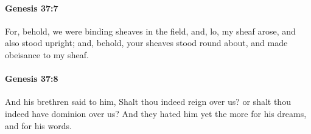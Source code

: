 		\paragraph{Genesis 37:7} %
			\label{GENESIS-37-7}

			For, behold, we were binding sheaves in the field, and, lo, my sheaf arose, and also stood upright; and, behold, your sheaves stood round about, and made obeisance to my sheaf.


		\paragraph{Genesis 37:8} %
			\label{GENESIS-37-8}

			And his brethren said to him, Shalt thou indeed reign over us? or shalt thou indeed have dominion over us? And they hated him yet the more for his dreams, and for his words.


